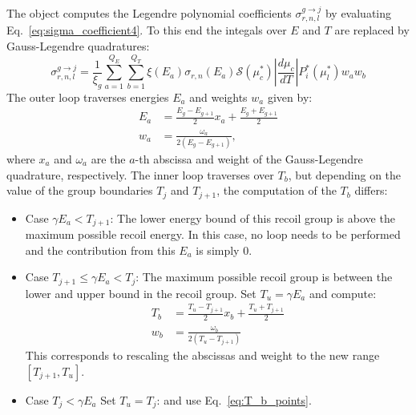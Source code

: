 \documentclass[review]{elsarticle}
\begin{document}
The object computes the Legendre polynomial coefficients $ \sigma_{r,n,l}^{g \rightarrow j}$ by evaluating Eq.~\ref{eq:sigma_coefficient4}. To this end the integals over $E$ and $T$ are replaced by 
Gauss-Legendre quadratures:
\begin{equation}
	\sigma_{r,n,l}^{g \rightarrow j} = \frac{1}{\xi_g}  \sum\limits_{a=1}^{Q_E}  \sum\limits_{b=1}^{Q_T} \xi (E_a)   \sigma_{r,n}(E_a)  \mathcal{S}(\mu_c^*) \left|  \frac{d \mu_c}{ dT} \right | P^*_i(\mu_l^*) w_a  w_b
	\label{eq:xs_num}
\end{equation}
The outer loop traverses energies $E_a$ and weights $w_a$ given by:
\begin{align}
   E_a &= \frac{E_g - E_{g+1}}{2} x_a +\frac{E_g + E_{g+1}}{2} \nonumber \\
   w_a &= \frac{\omega_a}{2 (E_g - E_{g+1})},
\end{align}
where $x_a$ and $\omega_a$ are the $a$-th abscissa and weight of the Gauss-Legendre quadrature, respectively. The inner loop traverses over $T_b$, but depending on the value of the group boundaries $T_{j}$ and $T_{j+1}$, the computation of the 
$T_b$ differs:
\begin{itemize}
  \item Case $ \gamma E_a < T_{j+1}$: The lower energy bound of this recoil group is above the maximum possible recoil energy. In this case, no loop needs to be performed and the contribution from this $E_a$ is simply $0$.
  \item Case $T_{j+1} \le \gamma E_a < T_{j}$: The maximum possible recoil group is between the lower and upper bound in the recoil group. Set $T_u = \gamma E_a$ and compute:
  \begin{align}\label{eq:T_b_points}
      T_b &= \frac{T_u - T_{j+1}}{2} x_b +\frac{T_u + T_{j+1}}{2} \nonumber \\
      w_b &=  \frac{\omega_b}{2 (T_u - T_{j+1})}
  \end{align}
      This corresponds to rescaling the abscissas and weight to the new range $[T_{j+1}, T_u]$.
    \item Case $T_{j} < \gamma E_a $ Set $T_u = T_{j}$: and use Eq.~\ref{eq:T_b_points}. 
\end{itemize}

\end{document}
